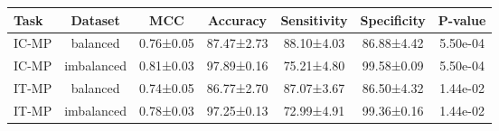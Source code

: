 \begin{tabular}{lcccccc}
\toprule
 Task &    Dataset &       MCC &   Accuracy & Sensitivity & Specificity &  P-value \\
\midrule
IC-MP &   balanced & 0.76±0.05 & 87.47±2.73 &  88.10±4.03 &  86.88±4.42 & 5.50e-04 \\
IC-MP & imbalanced & 0.81±0.03 & 97.89±0.16 &  75.21±4.80 &  99.58±0.09 & 5.50e-04 \\
IT-MP &   balanced & 0.74±0.05 & 86.77±2.70 &  87.07±3.67 &  86.50±4.32 & 1.44e-02 \\
IT-MP & imbalanced & 0.78±0.03 & 97.25±0.13 &  72.99±4.91 &  99.36±0.16 & 1.44e-02 \\
\bottomrule
\end{tabular}
